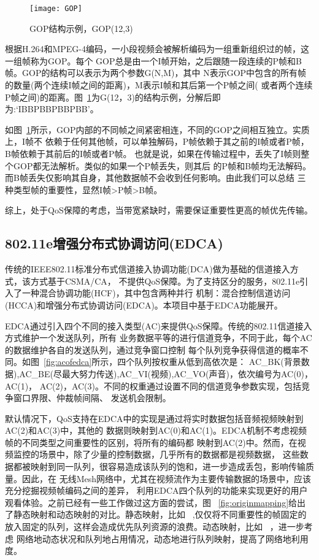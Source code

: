 \begin{figure}[H] %
  \centering
  \texttt{[image: GOP]}
  \caption{GOP结构示例，GOP(12,3)}
  \label{fig:gop}
\end{figure}
根据H.264和MPEG-4编码，一小段视频会被解析编码为一组重新组织过的帧，这一组帧称为GOP。每个
GOP总是由一个I帧开始，之后跟随一段连续的P帧和B帧。GOP的结构可以表示为两个参数G(N,M)，其中
N表示GOP中包含的所有帧的数量(两个连续I帧之间的距离)，M表示I帧和其后第一个P帧之间(
或者两个连续P帧之间)的距离。图~\ref{fig:gop}为G(12，3)的结构示例，分解后即为:‘IBBPBBPBBPBB’。

如图~\ref{fig:gop}所示，GOP内部的不同帧之间紧密相连，不同的GOP之间相互独立。实质上，I帧不
依赖于任何其他帧，可以单独解码，P帧依赖于其之前的I帧或者P帧，B帧依赖于其前后的I帧或者P帧。
也就是说，如果在传输过程中，丢失了I帧则整个GOP都无法解析。类似的如果一个P帧丢失，则其后
的P帧和B帧均无法解码。而B帧丢失仅影响其自身，其他数据帧不会收到任何影响。由此我们可以总结
三种类型帧的重要性，显然I帧>P帧>B帧。

综上，处于QoS保障的考虑，当带宽紧缺时，需要保证重要性更高的帧优先传输。

\subsection{802.11e增强分布式协调访问(EDCA)}
传统的IEEE802.11标准分布式信道接入协调功能(DCA)做为基础的信道接入方式，该方式基于CSMA/CA，
不提供QoS保障。为了支持区分的服务，802.11e引入了一种混合协调功能(HCF)，其中包含两种并行
机制：混合控制信道访问(HCCA)和增强分布式协调访问(EDCA)。本项目中基于EDCA功能展开。

EDCA通过引入四个不同的接入类型(AC)来提供QoS保障。传统的802.11信道接入方式维护一个发送队列，所有
业务数据平等的进行信道竞争，不同于此，每个AC的数据维护各自的发送队列，通过竞争窗口控制
每个队列竞争获得信道的概率不同。如图~\ref{fig:acofedca}所示，四个队列按权重从低到高依次是：
AC\_BK(背景数据),AC\_BE(尽最大努力传送),AC\_VI(视频),AC\_VO(声音)，依次编号为AC(0)，AC(1)，
AC(2)，AC(3)。不同的权重通过设置不同的信道竞争参数实现，包括竞争窗口界限、仲裁帧间隔、
发送机会限制。

默认情况下，QoS支持在EDCA中的实现是通过将实时数据包括音频视频映射到AC(2)和AC(3)中，其他的
数据则映射到AC(0)和AC(1)。EDCA机制不考虑视频帧的不同类型之间重要性的区别，将所有的编码都
映射到AC(2)中。然而，在视频监控的场景中，除了少量的控制数据，几乎所有的数据都是视频数据，
这些数据都被映射到同一队列，很容易造成该队列的饱和，进一步造成丢包，影响传输质量。因此，在
无线Mesh网络中，尤其在视频流作为主要传输数据的场景中，应该充分挖掘视频帧编码之间的差异，
利用EDCA四个队列的功能来实现更好的用户观看体验。之前已经有一些工作做过这方面的尝试，图
~\ref{fig:originmapping}给出了静态映射和动态映射的对比。静态映射，比如~\cite{staticmapping}
,仅仅将不同重要性的帧固定的放入固定的队列，这样会造成优先队列资源的浪费。动态映射，比如
~\cite{dynamicmapping}，进一步考虑
网络地动态状况和队列地占用情况，动态地进行队列映射，提高了网络地利用度。


